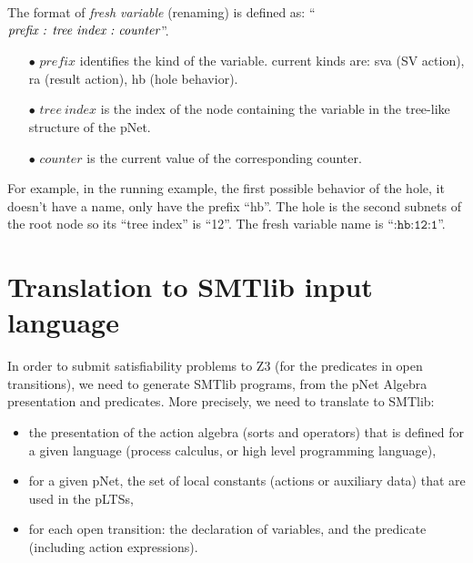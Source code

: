 \documentclass{lncs/llncs}
\newcommand{\TODO}[1]{\textcolor{red}{\textbf{[TODO:#1]}}}
\newcommand{\OTvar}{\texttt}
\begin{document}
\begin{definition}\label{fresh-variable}
The format of \emph{fresh variable} (renaming) is defined as:
``$\emph{prefix : tree\ index\ :\ counter}$''.
\begin{itemize}
   \item[$\bullet$] $prefix$ identifies the kind of the
     variable. current kinds are: sva (SV action), ra (result action), hb (hole behavior).
   \item[$\bullet$] $tree\ index$ is the index of the node containing the variable in the tree-like structure of the pNet.
   \item[$\bullet$] $counter$ is the current value of the corresponding counter.
\end{itemize}
\end{definition}



For example, in the running example, the first possible behavior of
the hole, it doesn't have a name, only have the prefix ``hb''. The
hole is the second subnets of the root node so its ``tree index'' is
``12''. The fresh variable name is ``$\OTvar{:hb:12:1}$''.


\section{Translation to SMTlib input language}
In order to submit satisfiability problems to Z3 (for the predicates
in open transitions), we need to generate SMTlib programs, from the
pNet Algebra presentation and predicates.
More precisely, we need to translate to SMTlib:
\begin{itemize}
  \item the presentation of the action algebra
    (sorts and operators) that is defined for a given language (process calculus, or high level programming language),
    \item for a given pNet, the set of local constants (actions or auxiliary data) that are used in the pLTSs,
    \item for each open transition: the declaration of variables, and
      the predicate (including action expressions).
\end{itemize}
\end{document}
